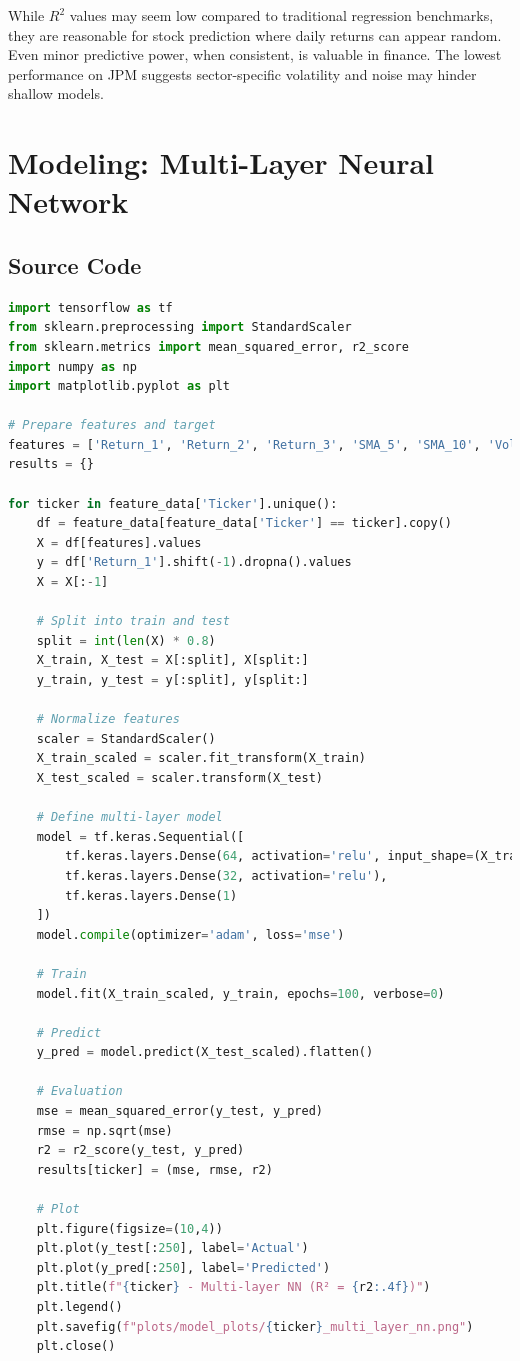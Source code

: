 \documentclass[12pt]{article}
\begin{document}
While $R^2$ values may seem low compared to traditional regression benchmarks, they are reasonable for stock prediction where daily returns can appear random. Even minor predictive power, when consistent, is valuable in finance. The lowest performance on JPM suggests sector-specific volatility and noise may hinder shallow models.
\section{Modeling: Multi-Layer Neural Network}

\subsection{Source Code}
\begin{lstlisting}[language=Python]
import tensorflow as tf
from sklearn.preprocessing import StandardScaler
from sklearn.metrics import mean_squared_error, r2_score
import numpy as np
import matplotlib.pyplot as plt

# Prepare features and target
features = ['Return_1', 'Return_2', 'Return_3', 'SMA_5', 'SMA_10', 'Volatility']
results = {}

for ticker in feature_data['Ticker'].unique():
    df = feature_data[feature_data['Ticker'] == ticker].copy()
    X = df[features].values
    y = df['Return_1'].shift(-1).dropna().values
    X = X[:-1]

    # Split into train and test
    split = int(len(X) * 0.8)
    X_train, X_test = X[:split], X[split:]
    y_train, y_test = y[:split], y[split:]

    # Normalize features
    scaler = StandardScaler()
    X_train_scaled = scaler.fit_transform(X_train)
    X_test_scaled = scaler.transform(X_test)

    # Define multi-layer model
    model = tf.keras.Sequential([
        tf.keras.layers.Dense(64, activation='relu', input_shape=(X_train.shape[1],)),
        tf.keras.layers.Dense(32, activation='relu'),
        tf.keras.layers.Dense(1)
    ])
    model.compile(optimizer='adam', loss='mse')

    # Train
    model.fit(X_train_scaled, y_train, epochs=100, verbose=0)

    # Predict
    y_pred = model.predict(X_test_scaled).flatten()

    # Evaluation
    mse = mean_squared_error(y_test, y_pred)
    rmse = np.sqrt(mse)
    r2 = r2_score(y_test, y_pred)
    results[ticker] = (mse, rmse, r2)

    # Plot
    plt.figure(figsize=(10,4))
    plt.plot(y_test[:250], label='Actual')
    plt.plot(y_pred[:250], label='Predicted')
    plt.title(f"{ticker} - Multi-layer NN (R² = {r2:.4f})")
    plt.legend()
    plt.savefig(f"plots/model_plots/{ticker}_multi_layer_nn.png")
    plt.close()
\end{lstlisting}
\end{document}
